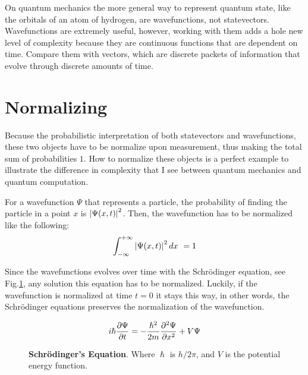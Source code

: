 On quantum mechanics the more general way to represent quantum state, like the orbitals of an atom of hydrogen, are wavefunctions, not statevectors. Wavefunctions are extremely useful, however, working with them adds a hole new level of complexity because they are continuous functions that are dependent on time. Compare them with vectors, which are discrete packets of information that evolve through discrete amounts of time.

\section{Normalizing}
Because the probabilistic interpretation of both statevectors and wavefunctions, these two objects have to be normalize upon measurement, thus making the total sum of probabilities $1$. How to normalize these objects is a perfect example to illustrate the difference in complexity that I see between quantum mechanics and quantum computation. 

 For a wavefunction $\Psi$ that represents a particle, the probability of finding the particle in a point $x$ is $\abs{\Psi(x,t)}^2$. Then, the wavefunction has to be normalized like the following:
\begin{equation}
\int_{-\infty}^{+\infty}\abs{\Psi(x,t)}^2\, dx\ = 1
\label{eq:norm_wave}
\end{equation}

Since the wavefunctions evolves over time with the Schrödinger equation, see Fig.\ref{fig:schro}, any solution this equation has to be normalized. Luckily, if the wavefunction is normalized at time $t=0$ it stays this way, in other words, the Schrödinger equations preserves the normalization of the wavefunction. 

\begin{figure}
	$$
	i\hslash \pdv{\Psi}{t} = -\frac{\hslash^2}{2m}\pdv[2]{\Psi}{x}+V\Psi
	$$
	\caption{\textbf{Schrödinger's Equation}. Where $\hslash$ is $h/2\pi$, and $V$ is the potential energy function.}
	\label{fig:schro}
\end{figure}

